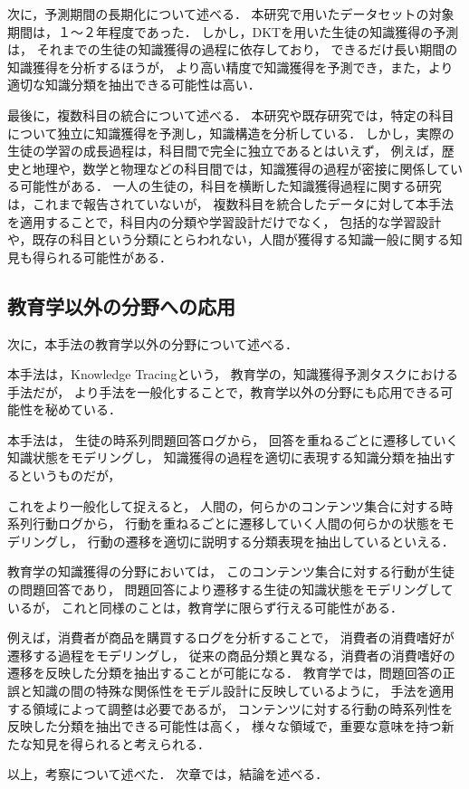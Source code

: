 次に，予測期間の長期化について述べる．
本研究で用いたデータセットの対象期間は，１〜２年程度であった．
しかし，DKTを用いた生徒の知識獲得の予測は，
それまでの生徒の知識獲得の過程に依存しており，
できるだけ長い期間の知識獲得を分析するほうが，
より高い精度で知識獲得を予測でき，また，より適切な知識分類を抽出できる可能性は高い．


最後に，複数科目の統合について述べる．
本研究や既存研究では，特定の科目について独立に知識獲得を予測し，知識構造を分析している．
しかし，実際の生徒の学習の成長過程は，科目間で完全に独立であるとはいえず，
例えば，歴史と地理や，数学と物理などの科目間では，知識獲得の過程が密接に関係している可能性がある．
一人の生徒の，科目を横断した知識獲得過程に関する研究は，これまで報告されていないが，
複数科目を統合したデータに対して本手法を適用することで，科目内の分類や学習設計だけでなく，
包括的な学習設計や，既存の科目という分類にとらわれない，人間が獲得する知識一般に関する知見も得られる可能性がある．



\subsection{教育学以外の分野への応用}
次に，本手法の教育学以外の分野について述べる．

本手法は，Knowledge Tracingという，
教育学の，知識獲得予測タスクにおける手法だが，
より手法を一般化することで，教育学以外の分野にも応用できる可能性を秘めている．

本手法は，
生徒の時系列問題回答ログから，
回答を重ねるごとに遷移していく知識状態をモデリングし，
知識獲得の過程を適切に表現する知識分類を抽出するというものだが，

これをより一般化して捉えると，
人間の，何らかのコンテンツ集合に対する時系列行動ログから，
行動を重ねるごとに遷移していく人間の何らかの状態をモデリングし，
行動の遷移を適切に説明する分類表現を抽出しているといえる．

教育学の知識獲得の分野においては，
このコンテンツ集合に対する行動が生徒の問題回答であり，
問題回答により遷移する生徒の知識状態をモデリングしているが，
これと同様のことは，教育学に限らず行える可能性がある．

例えば，消費者が商品を購買するログを分析することで，
消費者の消費嗜好が遷移する過程をモデリングし，
従来の商品分類と異なる，消費者の消費嗜好の遷移を反映した分類を抽出することが可能になる．
教育学では，問題回答の正誤と知識の間の特殊な関係性をモデル設計に反映しているように，
手法を適用する領域によって調整は必要であるが，
コンテンツに対する行動の時系列性を反映した分類を抽出できる可能性は高く，
様々な領域で，重要な意味を持つ新たな知見を得られると考えられる．




\vvspace
以上，考察について述べた．
次章では，結論を述べる．

